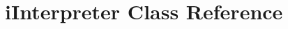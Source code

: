 \hypertarget{classiInterpreter}{
\section{iInterpreter Class Reference}
\label{classiInterpreter}
}
